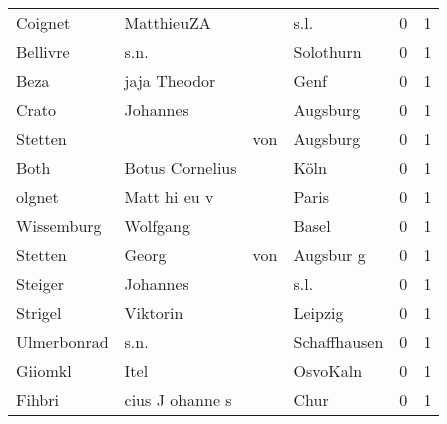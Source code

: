 \begin{tabular}{llllrr}
                  Coignet &                         MatthieuZA &             &                                        s.l. &          0 &         1 \\
                 Bellivre &                               s.n. &             &                                   Solothurn &          0 &         1 \\
                     Beza &                       jaja Theodor &             &                                        Genf &          0 &         1 \\
                    Crato &                           Johannes &             &                                    Augsburg &          0 &         1 \\
                  Stetten &                                    &         von &                                    Augsburg &          0 &         1 \\
                     Both &                    Botus Cornelius &             &                                        Köln &          0 &         1 \\
                   olgnet &                       Matt hi eu v &             &                                       Paris &          0 &         1 \\
               Wissemburg &                           Wolfgang &             &                                       Basel &          0 &         1 \\
                  Stetten &                              Georg &         von &                                   Augsbur g &          0 &         1 \\
                  Steiger &                           Johannes &             &                                        s.l. &          0 &         1 \\
                  Strigel &                           Viktorin &             &                                     Leipzig &          0 &         1 \\
              Ulmerbonrad &                               s.n. &             &                                Schaffhausen &          0 &         1 \\
                  Giiomkl &                               Itel &             &                                    OsvoKaln &          0 &         1 \\
                   Fihbri &                    cius J ohanne s &             &                                        Chur &          0 &         1 \\

\end{tabular}
